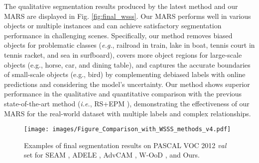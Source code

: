 \documentclass[10pt,twocolumn,letterpaper]{article}
\begin{document}
The qualitative segmentation results produced by the latest method \cite{jo2022recurseed} and our MARS are displayed in Fig. \ref{fig:final_wsss}. Our MARS performs well in various objects or multiple instances and can achieve satisfactory segmentation performance in challenging scenes. Specifically, our method removes biased objects for problematic classes (\emph{e.g.}, railroad in train, lake in boat, tennis court in tennis racket, and sea in surfboard), covers more object regions for large-scale objects (e.g., horse, car, and dining table), and captures the accurate boundaries of small-scale objects (e.g., bird) by complementing debiased labels with online predictions and considering the model's uncertainty. Our method shows superior performance in the qualitative and quantitative comparison with the previous state-of-the-art method (\emph{i.e.}, RS+EPM \cite{jo2022recurseed}), demonstrating the effectiveness of our MARS for the real-world dataset with multiple labels and complex relationships.

\begin{figure*}
  \centering
  \texttt{[image: images/Figure\_Comparison\_with\_WSSS\_methods\_v4.pdf]}
\caption{
      Examples of final segmentation results on PASCAL VOC 2012 \emph{val} set for SEAM \cite{wang2020self}, ADELE \cite{liu2022adaptive}, AdvCAM \cite{lee2021anti}, W-OoD \cite{lee2022weakly}, and Ours. }
  \label{fig:comparison_wsss}
\end{figure*}



\clearpage
\end{document}
